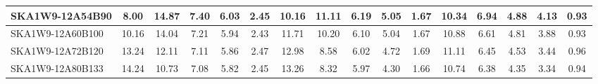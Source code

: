\begin{table}[H]
{{\begin{tabular}{|lccccc||ccccc||ccccc|}
SKA1W9-12A54B90 & 8.00 \cellcolor{blue!18.00} & 14.87 \cellcolor{red!60.00} & 7.40 \cellcolor{green!60.00} & 6.03 \cellcolor{orange!60.00} & 2.45 \cellcolor{purple!22.20} & 10.16 \cellcolor{blue!29.44} & 11.11 \cellcolor{red!60.00} & 6.19 \cellcolor{green!60.00} & 5.05 \cellcolor{orange!60.00} & 1.67 \cellcolor{purple!21.82} & 10.34 \cellcolor{blue!51.91} & 6.94 \cellcolor{red!60.00} & 4.88 \cellcolor{green!60.00} & 4.13 \cellcolor{orange!60.00} & 0.93 \cellcolor{purple!18.00}\\ \hline 
SKA1W9-12A60B100 & 10.16 \cellcolor{blue!32.54} & 14.04 \cellcolor{red!54.16} & 7.21 \cellcolor{green!48.26} & 5.94 \cellcolor{orange!53.00} & 2.43 \cellcolor{purple!18.00} & 11.71 \cellcolor{blue!44.72} & 10.20 \cellcolor{red!48.79} & 6.10 \cellcolor{green!53.59} & 5.04 \cellcolor{orange!59.44} & 1.67 \cellcolor{purple!21.82} & 10.88 \cellcolor{blue!57.59} & 6.61 \cellcolor{red!41.76} & 4.81 \cellcolor{green!54.45} & 3.88 \cellcolor{orange!46.71} & 0.93 \cellcolor{purple!18.00}\\ \hline 
SKA1W9-12A72B120 & 13.24 \cellcolor{blue!53.27} & 12.11 \cellcolor{red!40.58} & 7.11 \cellcolor{green!42.09} & 5.86 \cellcolor{orange!46.78} & 2.47 \cellcolor{purple!26.40} & 12.98 \cellcolor{blue!57.24} & 8.58 \cellcolor{red!28.84} & 6.02 \cellcolor{green!47.90} & 4.72 \cellcolor{orange!41.52} & 1.69 \cellcolor{purple!29.45} & 11.11 \cellcolor{blue!60.00} & 6.45 \cellcolor{red!32.92} & 4.53 \cellcolor{green!32.26} & 3.44 \cellcolor{orange!23.32} & 0.96 \cellcolor{purple!39.00}\\ \hline 
SKA1W9-12A80B133 & 14.24 \cellcolor{blue!60.00} & 10.73 \cellcolor{red!30.87} & 7.08 \cellcolor{green!40.24} & 5.82 \cellcolor{orange!43.67} & 2.45 \cellcolor{purple!22.20} & 13.26 \cellcolor{blue!60.00} & 8.32 \cellcolor{red!25.64} & 5.97 \cellcolor{green!44.34} & 4.30 \cellcolor{orange!18.00} & 1.66 \cellcolor{purple!18.00} & 10.74 \cellcolor{blue!56.12} & 6.38 \cellcolor{red!29.05} & 4.35 \cellcolor{green!18.00} & 3.34 \cellcolor{orange!18.00} & 0.94 \cellcolor{purple!25.00}\\ \hline 
\end{tabular}}
\vspace{-0.300000cm}
\hspace{1cm} 
}
\end{table}
